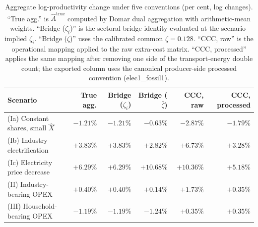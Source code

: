 \begin{table}[!htbp]
\centering
\caption{Aggregate log-productivity change under five conventions (per cent, log changes). ``True agg.'' is $\hat A^{\text{true}}$ computed by Domar dual aggregation with arithmetic-mean weights. ``Bridge ($\zeta_i$)'' is the sectoral bridge identity evaluated at the scenario-implied $\zeta_i$. ``Bridge ($\bar\zeta$)'' uses the calibrated common $\zeta=0.128$. ``CCC, raw'' is the operational mapping applied to the raw extra-cost matrix. ``CCC, processed'' applies the same mapping after removing one side of the transport-energy double count; the exported column uses the canonical producer-side processed convention (elec1_fossil1).}
\label{tab:toy_agg}
\begin{tabular}{lrrrrr}
\hline
Scenario & True agg. & Bridge ($\zeta_i$) & Bridge ($\bar\zeta$) & CCC, raw & CCC, processed \\
\hline
(Ia) Constant shares, small $\hat X$ & $-1.21 \% $ & $-1.21 \% $ & $-0.63 \% $ & $-2.87 \% $ & $-1.79 \% $ \\
(Ib) Industry electrification & $+3.83 \% $ & $+3.83 \% $ & $+2.82 \% $ & $+6.73 \% $ & $+3.28 \% $ \\
(Ic) Electricity price decrease & $+6.29 \% $ & $+6.29 \% $ & $+10.68 \% $ & $+10.36 \% $ & $+5.18 \% $ \\
(II) Industry-bearing OPEX & $+0.40 \% $ & $+0.40 \% $ & $+0.14 \% $ & $+1.73 \% $ & $+0.35 \% $ \\
(III) Household-bearing OPEX & $-1.19 \% $ & $-1.19 \% $ & $-1.24 \% $ & $+0.35 \% $ & $+0.35 \% $ \\
\hline
\end{tabular}
\end{table}
